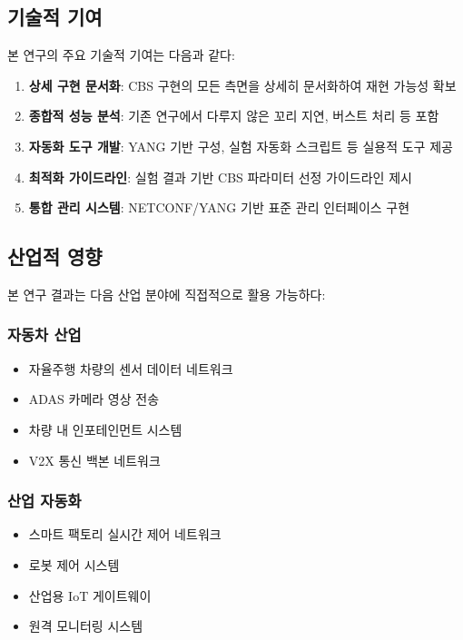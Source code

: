 \documentclass[twocolumn,10pt]{article}
\begin{document}
\subsection{기술적 기여}

본 연구의 주요 기술적 기여는 다음과 같다:

\begin{enumerate}
    \item \textbf{상세 구현 문서화}: CBS 구현의 모든 측면을 상세히 문서화하여 재현 가능성 확보
    
    \item \textbf{종합적 성능 분석}: 기존 연구에서 다루지 않은 꼬리 지연, 버스트 처리 등 포함
    
    \item \textbf{자동화 도구 개발}: YANG 기반 구성, 실험 자동화 스크립트 등 실용적 도구 제공
    
    \item \textbf{최적화 가이드라인}: 실험 결과 기반 CBS 파라미터 선정 가이드라인 제시
    
    \item \textbf{통합 관리 시스템}: NETCONF/YANG 기반 표준 관리 인터페이스 구현
\end{enumerate}

\subsection{산업적 영향}

본 연구 결과는 다음 산업 분야에 직접적으로 활용 가능하다:

\subsubsection{자동차 산업}

\begin{itemize}
    \item 자율주행 차량의 센서 데이터 네트워크
    \item ADAS 카메라 영상 전송
    \item 차량 내 인포테인먼트 시스템
    \item V2X 통신 백본 네트워크
\end{itemize}

\subsubsection{산업 자동화}

\begin{itemize}
    \item 스마트 팩토리 실시간 제어 네트워크
    \item 로봇 제어 시스템
    \item 산업용 IoT 게이트웨이
    \item 원격 모니터링 시스템
\end{itemize}
\end{document}
